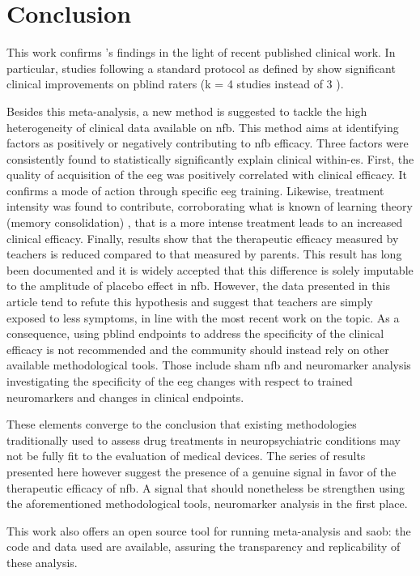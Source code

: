 

\section{Conclusion}

This work confirms \citet{Cortese2016}'s findings in the light of recent published clinical work.
In particular, studies following a standard protocol as defined by \citet{Arns2014} show significant 
clinical improvements on \gls{pblind} raters (k = 4 studies instead of 3 \citet{Cortese2016}).

Besides this meta-analysis, a new method is suggested to tackle the high heterogeneity of clinical data 
available on \gls{nfb}. This method aims at identifying factors as positively or negatively contributing 
to \gls{nfb} efficacy. Three factors were consistently found to statistically significantly explain clinical 
within-\gls{es}. First, the quality of acquisition of the \gls{eeg} was positively correlated with clinical 
efficacy. It confirms a mode of action through specific \gls{eeg} training. Likewise, treatment intensity was 
found to contribute, corroborating what is known of learning theory (memory consolidation) \citep{Mowrer1960}, 
that is a more intense treatment leads to an increased clinical efficacy. Finally, results show that the therapeutic 
efficacy measured by teachers is reduced compared to that measured by parents. This result has long been documented 
and it is widely accepted that this difference is solely imputable to the amplitude of placebo effect in \gls{nfb}. 
However, the data presented in this article tend to refute this hypothesis and suggest that teachers are simply 
exposed to less symptoms, in line with the most recent work on the topic. As a consequence, using \gls{pblind} 
endpoints to address the specificity of the clinical efficacy is not recommended and the community should instead 
rely on other available methodological tools. Those include sham \gls{nfb} and neuromarker analysis investigating 
the specificity of the \gls{eeg} changes with respect to trained neuromarkers and changes in clinical endpoints.

These elements converge to the conclusion that existing methodologies traditionally used to assess drug treatments 
in neuropsychiatric conditions may not be fully fit to the evaluation of medical devices. The series of results presented 
here however suggest the presence of a genuine signal in favor of the therapeutic efficacy of \gls{nfb}. A signal that 
should nonetheless be strengthen using the aforementioned methodological tools, neuromarker analysis in the first place.

This work also offers an open source tool for running meta-analysis and \gls{saob}: the code and data used are available, 
assuring the transparency and replicability of these analysis. 

